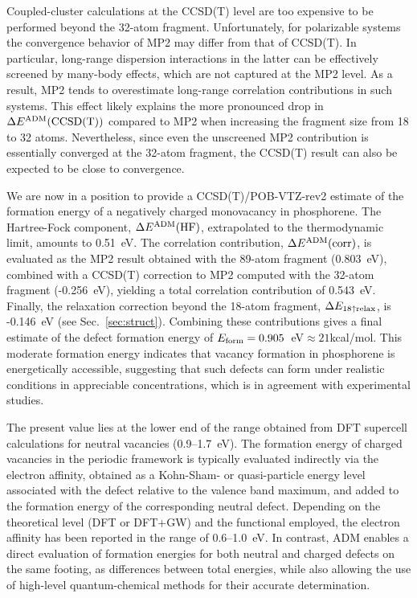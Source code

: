 \documentclass[aip,jcp,reprint]{revtex4-2}
\begin{document}
Coupled-cluster calculations at the CCSD(T) level are too expensive to be performed beyond the 32-atom fragment. Unfortunately, for polarizable systems the convergence behavior of MP2 may differ from that of CCSD(T). In particular, long-range dispersion interactions in the latter can be effectively screened by many-body effects, which are not captured at the MP2 level.\cite{black_p_exfoliation} As a result, MP2 tends to overestimate long-range correlation contributions in such systems. This effect likely explains the more pronounced drop in $\Delta E^{\rm ADM}({\rm CCSD(T)})$ compared to MP2 when increasing the fragment size from 18 to 32 atoms. Nevertheless, since even the unscreened MP2 contribution is essentially converged at the 32-atom fragment, the CCSD(T) result can also be expected to be close to convergence.



We are now in a position to provide a CCSD(T)/POB-VTZ-rev2 estimate of the formation energy of a negatively charged monovacancy in phosphorene. The Hartree-Fock component, $\Delta E^{\rm ADM}({\rm HF})$, extrapolated to the thermodynamic limit, amounts to 0.51~eV. The correlation contribution, $\Delta E^{\rm ADM}({\rm corr})$, is evaluated as the MP2 result obtained with the 89-atom fragment (0.803~eV), combined with a CCSD(T) correction to MP2 computed with the 32-atom fragment (-0.256~eV), yielding a total correlation contribution of 0.543~eV. Finally, the relaxation correction beyond the 18-atom fragment, $\Delta E_{\rm 18\uparrow \rm relax}$, is -0.146~eV (see Sec.~\ref{sec:struct}). 
Combining these contributions gives a final estimate of the defect formation energy of $E_{\rm form} = 0.905$~eV$\approx 21$kcal/mol.
This moderate formation energy indicates that vacancy formation in phosphorene is  energetically accessible, suggesting that such defects can form under realistic conditions in appreciable concentrations, which is in agreement with experimental studies.\cite{Kiraly2017_BPvacancies,Fang2021_BPchargedVacancy}


The present value lies at the lower end of the range obtained from DFT supercell calculations for neutral vacancies (0.9--1.7~eV).\cite{Hu2015_PhosphoreneVacancies,Naik2020_PRMaterials_PhosphoreneDefects,Rijal2021_PhosphoreneVacancy} The formation energy of charged vacancies in the periodic framework is typically evaluated indirectly via the electron affinity, obtained as a Kohn-Sham- or quasi-particle energy level associated with the defect relative to the valence band maximum, and added to the formation energy of the corresponding neutral defect. Depending on the theoretical level (DFT or DFT+GW) and the functional employed, the electron affinity has been reported in the range of 0.6--1.0~eV.\cite{Naik2020_PRMaterials_PhosphoreneDefects,Rijal2021_PhosphoreneVacancy}
In contrast, ADM enables a direct evaluation of formation energies for both neutral and charged defects on the same footing, as differences between total energies, while also allowing the use of high-level quantum-chemical methods for their accurate determination.
\end{document}
